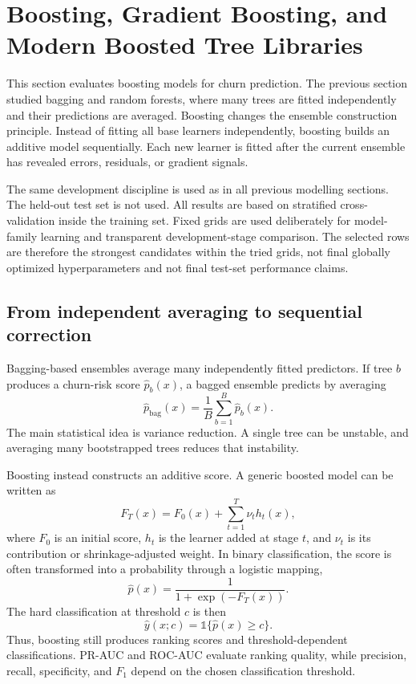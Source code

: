 \newpage
\section[Boosting, Gradient Boosting, and Modern Boosted Tree Libraries]{Boosting, Gradient Boosting, and Modern Boosted Tree \mbox{Libraries}}
\label{sec:boosting}

This section evaluates boosting models for churn prediction. The previous section studied bagging and random forests, where many trees are fitted independently and their predictions are averaged. Boosting changes the ensemble construction principle. Instead of fitting all base learners independently, boosting builds an additive model sequentially. Each new learner is fitted after the current ensemble has revealed errors, residuals, or gradient signals.

The same development discipline is used as in all previous modelling sections. The held-out test set is not used. All results are based on stratified cross-validation inside the training set. Fixed grids are used deliberately for model-family learning and transparent development-stage comparison. The selected rows are therefore the strongest candidates within the tried grids, not final globally optimized hyperparameters and not final test-set performance claims.

\subsection{From independent averaging to sequential correction}

Bagging-based ensembles average many independently fitted predictors. If tree \(b\) produces a churn-risk score \(\widehat{p}_b(x)\), a bagged ensemble predicts by averaging
\[
\widehat{p}_{\mathrm{bag}}(x)
=
\frac{1}{B}\sum_{b=1}^{B}\widehat{p}_b(x).
\]
The main statistical idea is variance reduction. A single tree can be unstable, and averaging many bootstrapped trees reduces that instability.

Boosting instead constructs an additive score. A generic boosted model can be written as
\[
F_T(x)
=
F_0(x)
+
\sum_{t=1}^{T}\nu_t h_t(x),
\]
where \(F_0\) is an initial score, \(h_t\) is the learner added at stage \(t\), and \(\nu_t\) is its contribution or shrinkage-adjusted weight. In binary classification, the score is often transformed into a probability through a logistic mapping,
\[
\widehat{p}(x)
=
\frac{1}{1+\exp(-F_T(x))}.
\]
The hard classification at threshold \(c\) is then
\[
\widehat{y}(x;c)=\mathbb{1}\{\widehat{p}(x)\geq c\}.
\]
Thus, boosting still produces ranking scores and threshold-dependent classifications. PR-AUC and ROC-AUC evaluate ranking quality, while precision, recall, specificity, and \(F_1\) depend on the chosen classification threshold.

